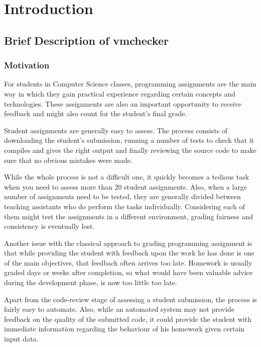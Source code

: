 \chapter{Introduction}
\label{chapter:intro}

\section{Brief Description of vmchecker}
\label{sec:vmc-history}

\subsection{Motivation}
\label{sub-sec:vmc-history-motiv}

For students in Computer Science classes, programming assignments are the main
way in which they gain practical experience regarding certain concepts and 
technologies. These assignments are also an important opportunity to receive 
feedback and might also count for the student's final grade.

Student assignments are generally easy to assess. The process consists of 
downloading the student's submission, running a number of tests to check that 
it compiles and gives the right output and finally reviewing the source code
to make sure that no obvious mistakes were made.

While the whole process is not a difficult one, it quickly becomes a tedious task
when you need to assess more than 20 student assignments. Also, when a large number
of assignments need to be tested, they are generally divided between teaching 
assistants who do perform the tasks individually. Considering each of them might
test the assignments in a different environment, grading fairness and consistency
is eventually lost.

Another issue with the classical approach to grading programming assignment is that
while providing the student with feedback upon the work he has done is one of the
main objectives, that feedback often arrives too late. Homework is usually graded
days or weeks after completion, so what would have been valuable advice during the
development phase, is now too little too late.

Apart from the code-review stage of assessing a student submission, the process is 
fairly easy to automate. Also, while an automated system may not provide feedback 
on the quality of the submitted code, it could provide the student with immediate
information regarding the behaviour of his homework given certain input data.

